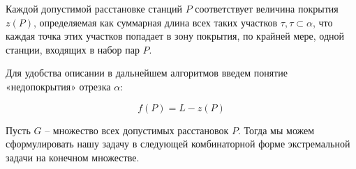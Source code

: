 
Каждой допустимой расстановке станций $P$ соответствует величина покрытия $z(P)$, определяемая как суммарная длина всех таких участков $\tau,\tau \subset \alpha$, что каждая точка этих 
участков попадает в зону покрытия, по крайней мере, одной станции, входящих в набор пар $P$.

Для удобства описании в дальнейшем алгоритмов введем понятие «недопокрытия» отрезка $\alpha$:

\begin{displaymath}
    f(P) = L - z(P)
\end{displaymath} 

Пусть $G$ -- множество всех допустимых расстановок $P$.
Тогда мы можем сформулировать нашу задачу в следующей комбинаторной форме экстремальной задачи на конечном множестве. 

